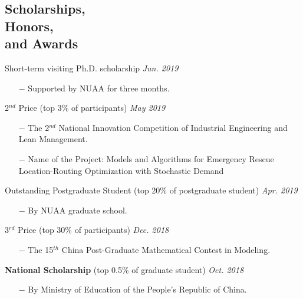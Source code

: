 \documentclass[margin]{res}
\begin{document}
\begin{resume}
\vspace{-.8em}
\section{\sc Scholarships, \\Honors, \\and Awards}


{Short-term visiting Ph.D. scholarship} \hfill {\it Jun. 2019}
\begin{itemize} \itemsep -2pt  %
\item[\(-\)] Supported by NUAA for three months.
\end{itemize}
\vspace{-.8em}

{2\(^{nd}\) Price} (top 3\% of participants)   \hfill {\it May 2019}
\begin{itemize} \itemsep -2pt  %
\item[\(-\)] The 2\(^{nd}\) National Innovation Competition of Industrial Engineering and Lean Management.
\item[\(-\)] Name of the Project: {Models and Algorithms for Emergency Rescue Location-Routing Optimization with Stochastic Demand}
\end{itemize}
\vspace{-.8em}

{Outstanding Postgraduate Student} (top 20\% of postgraduate student) \hfill {\it Apr. 2019}
\begin{itemize} \itemsep -2pt  %
\item[\(-\)] By NUAA graduate school.
\end{itemize}
\vspace{-.8em}

{3\(^{rd}\) Price} (top 30\% of participants)   \hfill {\it Dec. 2018}
\begin{itemize} \itemsep -2pt  %
\item[\(-\)] The 15\(^{th}\) China Post-Graduate Mathematical Contest in Modeling.
\end{itemize}
\vspace{-.8em}

{\bf National Scholarship} (top 0.5\% of graduate student) \hfill {\it Oct. 2018}
\begin{itemize} \itemsep -2pt  %
\item[\(-\)] By Ministry of Education of the People's Republic of China.
\end{itemize}
\vspace{-.8em}


\end{resume}
\end{document}
